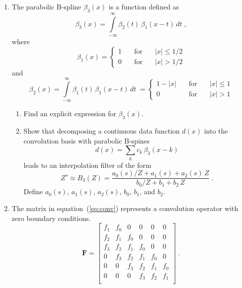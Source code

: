 \begin{enumerate}
\item The parabolic B-spline $\beta_3(x)$ is a function defined as
 \begin{equation}
   \label{eq:b3} 
   \beta_3(x) = \int\limits_{-\infty}^{\infty} \beta_2(t)\,\beta_1(x-t)\,d t\;,
\end{equation}
where
\begin{equation}
   \label{eq:b1}
   \beta_1(x) = \left\{\begin{array}{lcl} 1 & \quad\mbox{for}\quad & |x| \le 1/2 \\
       0 &\quad \mbox{for}\quad& |x| > 1/2\end{array}\right.
 \end{equation}
and
\begin{equation}
  \label{eq:b2} 
   \beta_2(x) = \int\limits_{-\infty}^{\infty} \beta_1(t)\,\beta_1(x-t)\,d t\;
   = \left\{\begin{array}{lcl} 1-|x| &\quad \mbox{for}\quad& |x| \le 1 \\
       0 & \quad \mbox{for}\quad&  |x| > 1\end{array}\right.
\end{equation}

\begin{enumerate}
\item Find an explicit expression for $\beta_3(x)$.
\item Show that decomposing a continuous data function $d(x)$ into the convolution basis 
  with parabolic B-spines
  \begin{equation}
    \label{eq:basis} 
    d(x) = \sum\limits_k c_k\,\beta_3(x-k)
  \end{equation}
  leads to an interpolation filter of the form
  \begin{equation}
    \label{eq:bz}
    Z^s \approx B_3(Z) = \frac{a_0(s)/Z + a_1(s) + a_2(s)\,Z}{b_0/Z + b_1 + b_2\,Z}\;.
  \end{equation}
  Define $a_0(s)$, $a_1(s)$, $a_2(s)$, $b_0$, $b_1$, and $b_2$.
\end{enumerate}

\newpage

\item The matrix in equation~(\ref{eq:conv}) represents a convolution operator with zero boundary conditions.
\begin{equation}
\label{eq:conv}
\mathbf{F} = \left[\begin{array}{llllll}
f_1 & f_0 & 0   & 0   & 0   & 0   \\
f_2 & f_1 & f_0 & 0   & 0   & 0   \\
f_3 & f_2 & f_1 & f_0 & 0   & 0   \\
0   & f_3 & f_2 & f_1 & f_0 & 0   \\
0   & 0   & f_3 & f_2 & f_1 & f_0 \\
0   & 0   & 0   & f_3 & f_2 & f_1 \\
\end{array}\right]\;.
\end{equation}


\end{enumerate}
